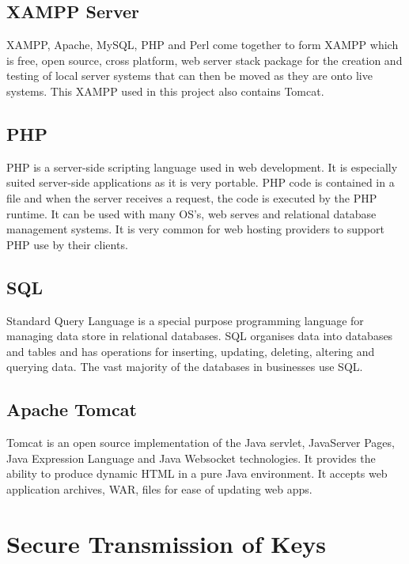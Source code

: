 \subsection{XAMPP Server}

XAMPP, Apache, MySQL, PHP and Perl come together to form XAMPP which is free, open source, cross platform, web server stack package for the creation and testing of local server systems that can then be moved as they are onto live systems. This XAMPP used in this project also contains Tomcat.

\subsection{PHP}
PHP is a server-side scripting language used in web development. It is especially suited server-side applications as it is very portable. PHP code is contained in a file and when the server receives a request, the code is executed by the PHP runtime. It can be used with many OS's, web serves and relational database management systems. It is very common for web hosting providers to support PHP use by their clients.

\subsection{SQL}

Standard Query Language is a special purpose programming language for managing data store in relational databases. SQL organises data into databases and tables and has operations for inserting, updating, deleting, altering and querying data. The vast majority of the databases in businesses use SQL.

\subsection{Apache Tomcat}

Tomcat is an open source implementation of the Java servlet, JavaServer Pages, Java Expression Language and Java Websocket technologies. It provides the ability to produce dynamic HTML in a pure Java environment. It accepts web application archives, WAR, files for ease of updating web apps.

\section{Secure Transmission of Keys}

